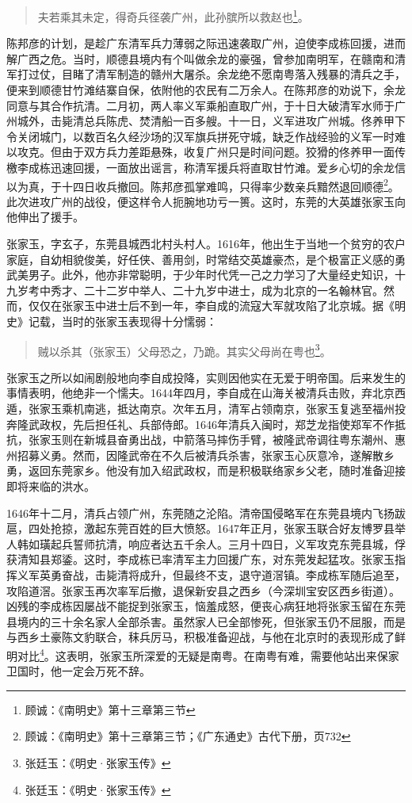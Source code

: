 \begin{quote}

夫若乘其未定，得奇兵径袭广州，此孙膑所以救赵也\footnote{顾诚：《南明史》第十三章第三节}。

\end{quote}

陈邦彦的计划，是趁广东清军兵力薄弱之际迅速袭取广州，迫使李成栋回援，进而解广西之危。当时，顺德县境内有个叫做余龙的豪强，曾参加南明军，在赣南和清军打过仗，目睹了清军制造的赣州大屠杀。余龙绝不愿南粤落入残暴的清兵之手，便来到顺德甘竹滩结寨自保，依附他的农民有二万余人。在陈邦彦的劝说下，余龙同意与其合作抗清。二月初，两人率义军乘船直取广州，于十日大破清军水师于广州城外，击毙清总兵陈虎、焚清船一百多艘。十一日，义军进攻广州城。佟养甲下令关闭城门，以数百名久经沙场的汉军旗兵拼死守城，缺乏作战经验的义军一时难以攻克。但由于双方兵力差距悬殊，收复广州只是时间问题。狡猾的佟养甲一面传檄李成栋迅速回援，一面放出谣言，称清军援兵将直取甘竹滩。爱乡心切的余龙信以为真，于十四日收兵撤回。陈邦彦孤掌难鸣，只得率少数亲兵黯然退回顺德\footnote{顾诚：《南明史》第十三章第三节；《广东通史》古代下册，页732}。此次进攻广州的战役，便这样令人扼腕地功亏一篑。这时，东莞的大英雄张家玉向他伸出了援手。

张家玉，字玄子，东莞县城西北村头村人。1616年，他出生于当地一个贫穷的农户家庭，自幼相貌俊美，好任侠、善用剑，时常结交英雄豪杰，是个极富正义感的勇武美男子。此外，他亦非常聪明，于少年时代凭一己之力学习了大量经史知识，十九岁考中秀才、二十二岁中举人、二十九岁中进士，成为北京的一名翰林官。然而，仅仅在张家玉中进士后不到一年，李自成的流寇大军就攻陷了北京城。据《明史》记载，当时的张家玉表现得十分懦弱：

\begin{quote}

贼以杀其（张家玉）父母恐之，乃跪。其实父母尚在粤也\footnote{张廷玉：《明史·张家玉传》}。

\end{quote}

张家玉之所以如闹剧般地向李自成投降，实则因他实在无爱于明帝国。后来发生的事情表明，他绝非一个懦夫。1644年四月，李自成在山海关被清兵击败，弃北京西遁，张家玉乘机南逃，抵达南京。次年五月，清军占领南京，张家玉复逃至福州投奔隆武政权，先后担任礼、兵部侍郎。1646年清兵入闽时，郑芝龙指使郑军不作抵抗，张家玉则在新城县奋勇出战，中箭落马摔伤手臂，被隆武帝调往粤东潮州、惠州招募义勇。然而，因隆武帝在不久后被清兵杀害，张家玉心灰意冷，遂解散乡勇，返回东莞家乡。他没有加入绍武政权，而是积极联络家乡父老，随时准备迎接即将来临的洪水。

1646年十二月，清兵占领广州，东莞随之沦陷。清帝国侵略军在东莞县境内飞扬跋扈，四处抢掠，激起东莞百姓的巨大愤怒。1647年正月，张家玉联合好友博罗县举人韩如璜起兵誓师抗清，响应者达五千余人。三月十四日，义军攻克东莞县城，俘获清知县郑鋈。这时，李成栋已率清军主力回援广东，对东莞发起猛攻。张家玉指挥义军英勇奋战，击毙清将成升，但最终不支，退守道滘镇。李成栋军随后追至，攻陷道滘。张家玉再次率军后撤，退保新安县之西乡（今深圳宝安区西乡街道）。凶残的李成栋因屡战不能捉到张家玉，恼羞成怒，便丧心病狂地将张家玉留在东莞县境内的三十余名家人全部杀害。虽然家人已全部惨死，但张家玉仍不屈服，而是与西乡土豪陈文豹联合，秣兵厉马，积极准备迎战，与他在北京时的表现形成了鲜明对比\footnote{张廷玉：《明史·张家玉传》}。这表明，张家玉所深爱的无疑是南粤。在南粤有难，需要他站出来保家卫国时，他一定会万死不辞。

